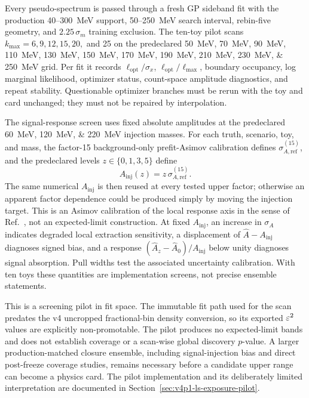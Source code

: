 Every pseudo-spectrum is passed through a fresh GP sideband fit with the production
40--300~MeV support, 50--250~MeV search interval, rebin-five geometry, and
$2.25\,\sigma_m$ training exclusion. The ten-toy pilot scans
$k_{\max}=6,9,12,15,20,$ and 25 on the predeclared
\SIlist{50;70;90;110;130;150;170;190;210;230;250}{MeV} grid. Per fit it records
$\ell_{\mathrm{opt}}/\sigma_x$, $\ell_{\mathrm{opt}}/\ell_{\max}$, boundary
occupancy, log marginal likelihood, optimizer status, count-space amplitude
diagnostics, and repeat stability. Questionable optimizer branches must be rerun with
the toy and card unchanged; they must not be repaired by interpolation.

The signal-response screen uses fixed absolute amplitudes at the predeclared
\SIlist{60;120;220}{MeV} injection masses. For each truth, scenario, toy, and mass,
the factor-15 background-only prefit-Asimov calibration defines
$\sigma_{A,\mathrm{ref}}^{(15)}$, and the predeclared levels
$z\in\{0,1,3,5\}$ define
\begin{equation}
A_{\mathrm{inj}}(z)=z\,\sigma_{A,\mathrm{ref}}^{(15)} .
\label{eq:v4p1-fixed-amplitude-anchor}
\end{equation}
The same numerical $A_{\mathrm{inj}}$ is then reused at every tested upper factor;
otherwise an apparent factor dependence could be produced simply by moving the
injection target. This is an Asimov calibration of the local response axis in the
sense of Ref.~\cite{Cowan2011}, not an expected-limit construction. At fixed
$A_{\mathrm{inj}}$, an increase in $\sigma_A$ indicates degraded local extraction
sensitivity, a displacement of $\hat A-A_{\mathrm{inj}}$ diagnoses signed bias, and
a response $(\hat A_z-\hat A_0)/A_{\mathrm{inj}}$ below unity diagnoses signal
absorption. Pull widths test the associated uncertainty calibration. With ten toys
these quantities are implementation screens, not precise ensemble statements.

This is a screening pilot in fit space. The immutable fit path used for the scan
predates the v4 uncropped fractional-bin density conversion, so its exported
$\varepsilon^2$ values are explicitly non-promotable. The pilot produces no expected-limit
bands and does not establish \CLs{} coverage or a scan-wise global discovery
$p$-value. A larger production-matched closure ensemble, including signal-injection
bias and direct post-freeze coverage studies, remains necessary before a candidate
upper range can become a physics card. The pilot implementation and its deliberately
limited interpretation are documented in
Section~\ref{sec:v4p1-ls-exposure-pilot}.


